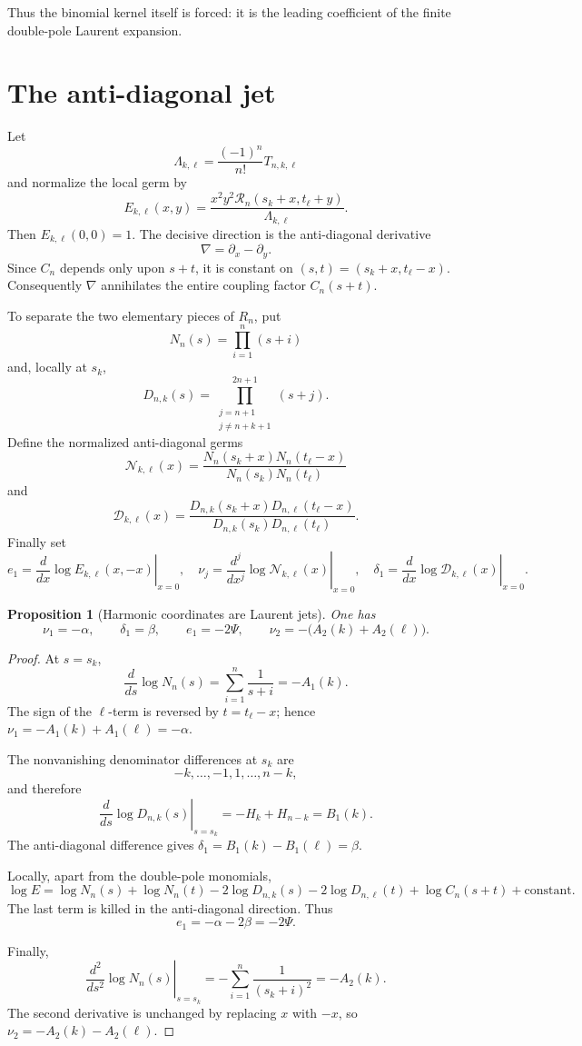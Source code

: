 \documentclass[11pt]{article}
\newtheorem{proposition}{Proposition}
\begin{document}
Thus the binomial kernel itself is forced: it is the leading coefficient of
the finite double-pole Laurent expansion.

\section{The anti-diagonal jet}

Let
\[
 \Lambda_{k,\ell}
 =
 \frac{(-1)^n}{n!}T_{n,k,\ell}
\]
and normalize the local germ by
\[
 E_{k,\ell}(x,y)=
 \frac{x^2y^2
 \mathcal R_n(s_k+x,t_\ell+y)}
 {\Lambda_{k,\ell}}.
\]
Then \(E_{k,\ell}(0,0)=1\).
The decisive direction is the anti-diagonal derivative
\[
 \nabla=\partial_x-\partial_y.
\]
Since \(C_n\) depends only upon \(s+t\), it is constant on
\((s,t)=(s_k+x,t_\ell-x)\).  Consequently \(\nabla\) annihilates the entire
coupling factor \(C_n(s+t)\).

To separate the two elementary pieces of \(R_n\), put
\[
 N_n(s)=\prod_{i=1}^n(s+i)
\]
and, locally at \(s_k\),
\[
 D_{n,k}(s)=
 \prod_{\substack{j=n+1\\j\neq n+k+1}}^{2n+1}(s+j).
\]
Define the normalized anti-diagonal germs
\[
 \mathcal N_{k,\ell}(x)=
 \frac{N_n(s_k+x)N_n(t_\ell-x)}
      {N_n(s_k)N_n(t_\ell)}
\]
and
\[
 \mathcal D_{k,\ell}(x)=
 \frac{D_{n,k}(s_k+x)D_{n,\ell}(t_\ell-x)}
      {D_{n,k}(s_k)D_{n,\ell}(t_\ell)}.
\]
Finally set
\[
 e_1=\left.\frac{d}{dx}
 \log E_{k,\ell}(x,-x)\right|_{x=0},
\quad
 \nu_j=\left.\frac{d^j}{dx^j}
 \log\mathcal N_{k,\ell}(x)\right|_{x=0},
\quad
 \delta_1=\left.\frac{d}{dx}
 \log\mathcal D_{k,\ell}(x)\right|_{x=0}.
\]

\begin{proposition}[Harmonic coordinates are Laurent jets]
\label{prop:jets}
One has
\[
 \nu_1=-\alpha,\qquad
 \delta_1=\beta,\qquad
 e_1=-2\Psi,\qquad
 \nu_2=-\bigl(A_2(k)+A_2(\ell)\bigr).
\]
\end{proposition}

\begin{proof}
At \(s=s_k\),
\[
 \frac{d}{ds}\log N_n(s)
 =
 \sum_{i=1}^n\frac1{s+i}
 =
 -A_1(k).
\]
The sign of the \(\ell\)-term is reversed by \(t=t_\ell-x\); hence
\(\nu_1=-A_1(k)+A_1(\ell)=-\alpha\).

The nonvanishing denominator differences at \(s_k\) are
\[
 -k,\ldots,-1,1,\ldots,n-k,
\]
and therefore
\[
 \left.\frac{d}{ds}\log D_{n,k}(s)\right|_{s=s_k}
 =-H_k+H_{n-k}=B_1(k).
\]
The anti-diagonal difference gives
\(\delta_1=B_1(k)-B_1(\ell)=\beta\).

Locally, apart from the double-pole monomials,
\[
 \log E=
 \log N_n(s)+\log N_n(t)
 -2\log D_{n,k}(s)-2\log D_{n,\ell}(t)
 +\log C_n(s+t)+\text{constant}.
\]
The last term is killed in the anti-diagonal direction.  Thus
\[
 e_1=-\alpha-2\beta=-2\Psi.
\]

Finally,
\[
 \left.\frac{d^2}{ds^2}\log N_n(s)\right|_{s=s_k}
 =
 -\sum_{i=1}^n\frac1{(s_k+i)^2}
 =-A_2(k).
\]
The second derivative is unchanged by replacing \(x\) with \(-x\), so
\(\nu_2=-A_2(k)-A_2(\ell)\).
\end{proof}
\end{document}
